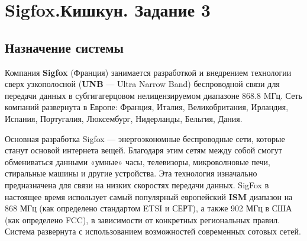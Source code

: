 \section{Sigfox.Кишкун. Задание 3}
\subsection{Назначение системы}
Компания \textbf{Sigfox} (Франция) занимается разработкой и внедрением технологии сверх узкополосной (\textbf{UNB} — Ultra Narrow Band) беспроводной связи для передачи данных в субгигагерцовом нелицензируемом диапазоне 868.8 MГц. Сеть компаний развернута в Европе: Франция, Италия, Великобритания, Ирландия, Испания, Португалия, Люксембург, Нидерланды, Бельгия, Дания. 

Основная разработка Sigfox — энергоэкономные беспроводные сети, которые станут основой интернета вещей. Благодаря этим сетям между собой смогут обмениваться данными «умные» часы, телевизоры, микроволновые печи, стиральные машины и другие устройства. Эта технология изначально предназначена для связи на низких скоростях передачи данных. SigFox в настоящее время использует самый популярный европейский \textbf{ISM} диапазон на 868 МГц (как определено стандартом ETSI и СЕРТ), а также 902 МГц в США (как определено FCC), в зависимости от конкретных региональных правил. Система развернута с использованием возможностей современных сотовых сетей.
